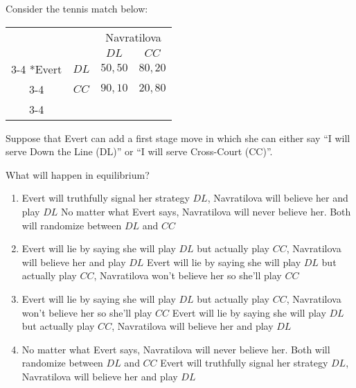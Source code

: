 \documentclass{article}
\begin{document}
\begin{question}[type=exam]{4}
  Consider the tennis match below:
  \begin{table}[!h]
    \centering
    \begin{tabular}{cc|c|c|}
    & \multicolumn{1}{c}{} & \multicolumn{2}{c}{Navratilova}\\
    & \multicolumn{1}{c}{} & \multicolumn{1}{c}{$DL$}  & \multicolumn{1}{c}{$CC$} \\\cline{3-4}
    \multirow{2}*{Evert}  & $DL$ & $50, 50$ & $80,20$ \\\cline{3-4}
                          & $CC$ & $90, 10$ & $20,80$ \\\cline{3-4}
  \end{tabular}
  \end{table}

  Suppose that Evert can add a first stage move in which she can either say 
  ``I will serve Down the Line (DL)'' or ``I will serve Cross-Court (CC)''.

  What will happen in equilibrium?
  \begin{enumerate}[label=\alph*), noitemsep]
    \item \vary
    {Evert will truthfully signal her strategy $DL$, Navratilova will believe her and play $DL$}
    {No matter what Evert says, Navratilova will never believe her. Both will randomize between $DL$ and $CC$} %
    \item \vary
    {Evert will lie by saying she will play $DL$ but actually play $CC$, Navratilova will believe her and play $DL$}
    {Evert will lie by saying she will play $DL$ but actually play $CC$, Navratilova won't believe her so she'll play $CC$}
    \item \vary
    {Evert will lie by saying she will play $DL$ but actually play $CC$, Navratilova won't believe her so she'll play $CC$}
    {Evert will lie by saying she will play $DL$ but actually play $CC$, Navratilova will believe her and play $DL$}
    \item \vary
    {No matter what Evert says, Navratilova will never believe her. Both will randomize between $DL$ and $CC$} %
    {Evert will truthfully signal her strategy $DL$, Navratilova will believe her and play $DL$}
  \end{enumerate}
\end{question}
\end{document}
